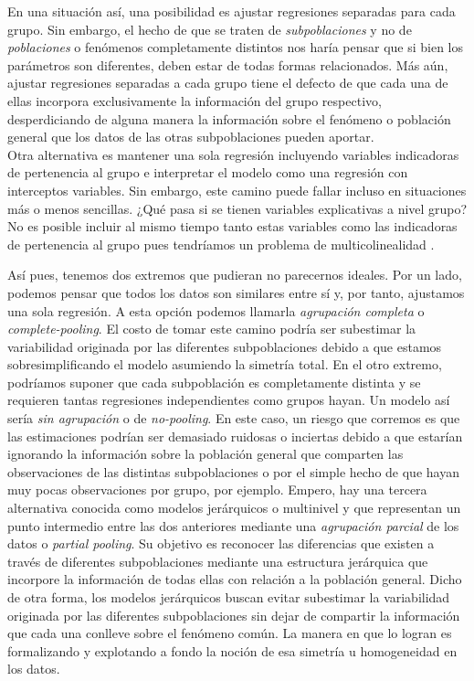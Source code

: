 En una situación así, una posibilidad es ajustar regresiones separadas para cada grupo. Sin embargo, el hecho de que se traten de \textit{subpoblaciones} y no de \textit{poblaciones} o fenómenos completamente distintos nos haría pensar que si bien los parámetros son diferentes, deben estar de todas formas relacionados. Más aún, ajustar regresiones separadas a cada grupo tiene el defecto de que cada una de ellas incorpora exclusivamente la información del grupo respectivo, desperdiciando de alguna manera la información sobre el fenómeno o población general que los datos de las otras subpoblaciones pueden aportar.\\

Otra alternativa es mantener una sola regresión incluyendo variables indicadoras de pertenencia al grupo e interpretar el modelo como una regresión con interceptos variables. Sin embargo, este camino puede fallar incluso en situaciones más o menos sencillas. ¿Qué pasa si se tienen variables explicativas a nivel grupo? No es posible incluir al mismo tiempo tanto estas variables como las indicadoras de pertenencia al grupo pues tendríamos un problema de multicolinealidad \parencite[7]{GelmanHill06}. 

Así pues, tenemos dos extremos que pudieran no parecernos ideales. Por un lado, podemos pensar que todos los datos son similares entre sí y, por tanto, ajustamos una sola regresión. A esta opción podemos llamarla \textit{agrupación completa} o \textit{complete-pooling}. El costo de tomar este camino podría ser subestimar la variabilidad originada por las diferentes subpoblaciones debido a que estamos sobresimplificando el modelo asumiendo la simetría total. En el otro extremo, podríamos suponer que cada subpoblación es completamente distinta y se requieren tantas regresiones independientes como grupos hayan. Un modelo así sería \textit{sin agrupación} o de \textit{no-pooling}. En este caso, un riesgo que corremos es que las estimaciones podrían ser demasiado ruidosas o inciertas debido a que estarían ignorando la información sobre la población general que comparten las observaciones de las distintas subpoblaciones o por el simple hecho de que hayan muy pocas observaciones por grupo, por ejemplo. Empero, hay una tercera alternativa conocida como modelos jerárquicos o multinivel y que representan un punto intermedio entre las dos anteriores mediante una \textit{agrupación parcial} de los datos o \textit{partial pooling}. Su objetivo es reconocer las diferencias que existen a través de diferentes subpoblaciones mediante una estructura jerárquica que incorpore la información de todas ellas con relación a la población general. Dicho de otra forma, los modelos jerárquicos buscan evitar subestimar la variabilidad originada por las diferentes subpoblaciones sin dejar de compartir la información que cada una conlleve sobre el fenómeno común. La manera en que lo logran es formalizando y explotando a fondo la noción de esa simetría u homogeneidad en los datos.  

